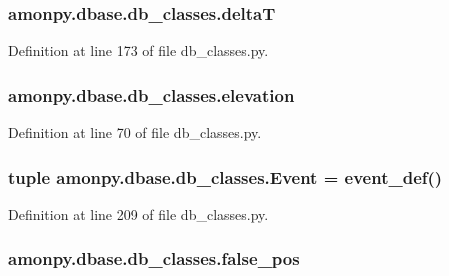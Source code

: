 \hypertarget{namespaceamonpy_1_1dbase_1_1db__classes_a4da539a081d13412d12017ea4d2ef1e1}{
\subsubsection[{delta\-T}]{\setlength{\rightskip}{0pt plus 5cm}amonpy.\-dbase.\-db\-\_\-classes.\-delta\-T}}\label{namespaceamonpy_1_1dbase_1_1db__classes_a4da539a081d13412d12017ea4d2ef1e1}


Definition at line 173 of file db\-\_\-classes.\-py.

\hypertarget{namespaceamonpy_1_1dbase_1_1db__classes_a5a1632bf843d0f0ae5900eb04aaad787}{
\subsubsection[{elevation}]{\setlength{\rightskip}{0pt plus 5cm}amonpy.\-dbase.\-db\-\_\-classes.\-elevation}}\label{namespaceamonpy_1_1dbase_1_1db__classes_a5a1632bf843d0f0ae5900eb04aaad787}


Definition at line 70 of file db\-\_\-classes.\-py.

\hypertarget{namespaceamonpy_1_1dbase_1_1db__classes_addf9b6ab76d93bfdebf988a2895ff34f}{
\subsubsection[{Event}]{\setlength{\rightskip}{0pt plus 5cm}tuple amonpy.\-dbase.\-db\-\_\-classes.\-Event = {\bf event\-\_\-def}()}}\label{namespaceamonpy_1_1dbase_1_1db__classes_addf9b6ab76d93bfdebf988a2895ff34f}


Definition at line 209 of file db\-\_\-classes.\-py.

\hypertarget{namespaceamonpy_1_1dbase_1_1db__classes_a1dc960a2cbb148fcf2d7be31578f6d7c}{
\subsubsection[{false\-\_\-pos}]{\setlength{\rightskip}{0pt plus 5cm}amonpy.\-dbase.\-db\-\_\-classes.\-false\-\_\-pos}}\label{namespaceamonpy_1_1dbase_1_1db__classes_a1dc960a2cbb148fcf2d7be31578f6d7c}


